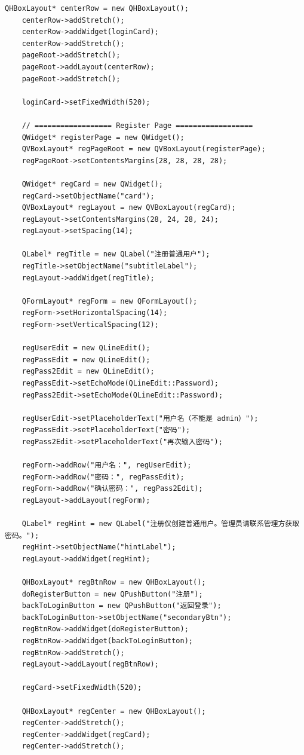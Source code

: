 \documentclass[UTF8,12pt,a4paper]{ctexart}
\begin{document}
\begin{lstlisting}[caption={mainwindow.cpp 源码}]
    QHBoxLayout* centerRow = new QHBoxLayout();
    centerRow->addStretch();
    centerRow->addWidget(loginCard);
    centerRow->addStretch();
    pageRoot->addStretch();
    pageRoot->addLayout(centerRow);
    pageRoot->addStretch();

    loginCard->setFixedWidth(520);

    // ================== Register Page ==================
    QWidget* registerPage = new QWidget();
    QVBoxLayout* regPageRoot = new QVBoxLayout(registerPage);
    regPageRoot->setContentsMargins(28, 28, 28, 28);

    QWidget* regCard = new QWidget();
    regCard->setObjectName("card");
    QVBoxLayout* regLayout = new QVBoxLayout(regCard);
    regLayout->setContentsMargins(28, 24, 28, 24);
    regLayout->setSpacing(14);

    QLabel* regTitle = new QLabel("注册普通用户");
    regTitle->setObjectName("subtitleLabel");
    regLayout->addWidget(regTitle);

    QFormLayout* regForm = new QFormLayout();
    regForm->setHorizontalSpacing(14);
    regForm->setVerticalSpacing(12);

    regUserEdit = new QLineEdit();
    regPassEdit = new QLineEdit();
    regPass2Edit = new QLineEdit();
    regPassEdit->setEchoMode(QLineEdit::Password);
    regPass2Edit->setEchoMode(QLineEdit::Password);

    regUserEdit->setPlaceholderText("用户名（不能是 admin）");
    regPassEdit->setPlaceholderText("密码");
    regPass2Edit->setPlaceholderText("再次输入密码");

    regForm->addRow("用户名：", regUserEdit);
    regForm->addRow("密码：", regPassEdit);
    regForm->addRow("确认密码：", regPass2Edit);
    regLayout->addLayout(regForm);

    QLabel* regHint = new QLabel("注册仅创建普通用户。管理员请联系管理方获取密码。");
    regHint->setObjectName("hintLabel");
    regLayout->addWidget(regHint);

    QHBoxLayout* regBtnRow = new QHBoxLayout();
    doRegisterButton = new QPushButton("注册");
    backToLoginButton = new QPushButton("返回登录");
    backToLoginButton->setObjectName("secondaryBtn");
    regBtnRow->addWidget(doRegisterButton);
    regBtnRow->addWidget(backToLoginButton);
    regBtnRow->addStretch();
    regLayout->addLayout(regBtnRow);

    regCard->setFixedWidth(520);

    QHBoxLayout* regCenter = new QHBoxLayout();
    regCenter->addStretch();
    regCenter->addWidget(regCard);
    regCenter->addStretch();


\end{lstlisting}
\end{document}
